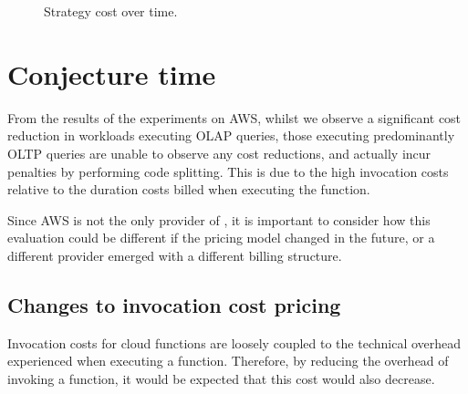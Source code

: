 \begin{figure*}
    \begin{center}
        
    \end{center}
    \caption{Strategy cost over time.}
    \label{fig:strategy-decision-over-time}
\end{figure*}


%        

%        

\section{Conjecture time}
From the results of the experiments on AWS, whilst we observe a significant cost reduction in workloads executing OLAP queries, those executing predominantly OLTP queries are unable to observe any cost reductions, and actually incur penalties by performing code splitting. This is due to the high invocation costs relative to the duration costs billed when executing the function.

Since AWS is not the only provider of \faas{}, it is important to consider how this evaluation could be different if the pricing model changed in the future, or a different provider emerged with a different billing structure.

\subsection{Changes to invocation cost pricing}
Invocation costs for cloud functions are loosely coupled to the technical overhead experienced when executing a \faas{} function. Therefore, by reducing the overhead of invoking a function, it would be expected that this cost would also decrease.

